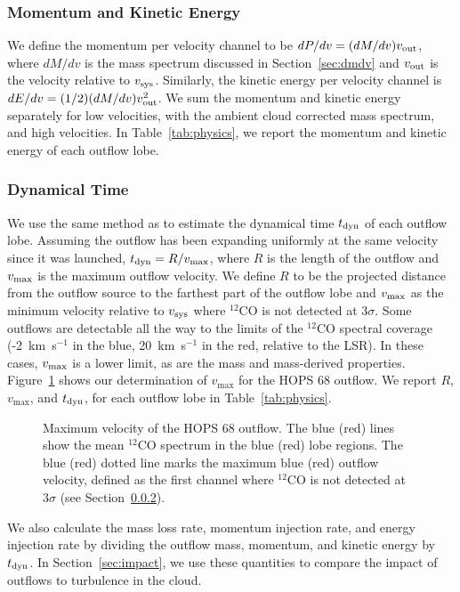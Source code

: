 \documentclass[twocolumn]{aastex63}
\newcommand{\example}{HOPS 68}
\newcommand{\kms}{km~s$^{-1}$}
\newcommand{\co}[1][]{\ensuremath{^{#1}}CO}
\begin{document}
\subsubsection{Momentum and Kinetic Energy}

We define the momentum per velocity channel to be $dP/dv = (dM/dv) v_{\rm out}$, where $dM/dv$ is the mass spectrum discussed in Section~\ref{sec:dmdv} and $v_{\rm out}$ is the velocity relative to $v_{\rm sys}$. Similarly, the kinetic energy per velocity channel is $dE/dv = (1/2) (dM/dv)  v_{\rm out}^2$. We sum the momentum and kinetic energy separately for low velocities, with the ambient cloud corrected mass spectrum, and high velocities. In Table~\ref{tab:physics}, we report the momentum and kinetic energy of each outflow lobe.

\subsubsection{Dynamical Time}\label{sec:tdyn}
We use the same method as \citet{Curtis10} to estimate the dynamical time $t_{\rm dyn}$ of each outflow lobe. Assuming the outflow has been expanding uniformly at the same velocity since it was launched, $t_{\rm dyn} = R / v_{\rm max}$, where $R$ is the length of the outflow and $v_{\rm max}$ is the maximum outflow velocity. We define $R$ to be the projected distance from the outflow source to the farthest part of the outflow lobe and $v_{\rm max}$ as the minimum velocity relative to $v_{\rm sys}$ where \co[12]{} is not detected at $3\sigma$. Some outflows are detectable all the way to the limits of the \co[12]{} spectral coverage (-2~\kms{} in the blue, 20~\kms{} in the red, relative to the LSR). In these cases, $v_{\rm max}$ is a lower limit, as are the mass and mass-derived properties. Figure~\ref{fig:vmax} shows our determination of $v_{\max}$ for the \example{} outflow. We report $R$, $v_{\max}$, and $t_{\rm dyn}$, for each outflow lobe in Table~\ref{tab:physics}.

\begin{figure}
\caption{Maximum velocity of the \example{} outflow. The blue (red) lines show the mean \co[12]{} spectrum in the blue (red) lobe regions. The blue (red) dotted line marks the maximum blue (red) outflow velocity, defined as the first channel where \co[12]{} is not detected at $3\sigma$ (see Section~\ref{sec:tdyn}).\label{fig:vmax}}
\end{figure}

We also calculate the mass loss rate, momentum injection rate, and energy injection rate by dividing the outflow mass, momentum, and kinetic energy by $t_{\rm dyn}$. In Section~\ref{sec:impact}, we use these quantities to compare the impact of outflows to turbulence in the cloud.
\end{document}
